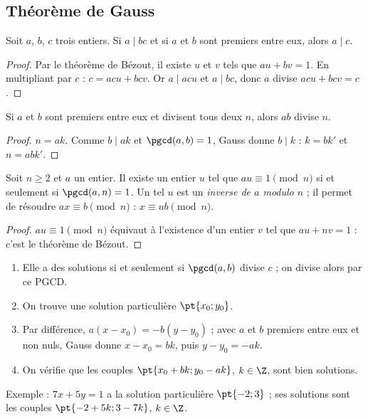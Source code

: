 \subsection{Théorème de Gauss}
\begin{theorem}
Soit $a$, $b$, $c$ trois entiers. Si $a\mid bc$ et si $a$ et $b$ sont premiers entre eux, alors $a\mid c$.
\end{theorem}
\begin{proof}
Par le théorème de Bézout, il existe $u$ et $v$ tels que $au+bv=1$. En multipliant par $c$ : $c=acu+bcv$. Or $a\mid acu$ et $a\mid bc$, donc $a$ divise $acu+bcv=c$.
\end{proof}
\begin{theorem}[Corollaire]
Si $a$ et $b$ sont premiers entre eux et divisent tous deux $n$, alors $ab$ divise $n$.
\end{theorem}
\begin{proof}
$n=ak$. Comme $b\mid ak$ et $\pgcd(a,b)=1$, Gauss donne $b\mid k$ : $k=bk'$ et $n=abk'$.
\end{proof}
\begin{theorem}
Soit $n\ge2$ et $a$ un entier. Il existe un entier $u$ tel que $au\equiv1\pmod n$ si et seulement si $\pgcd(a,n)=1$. Un tel $u$ est un \emph{inverse de $a$ modulo $n$} ; il permet de résoudre $ax\equiv b\pmod n$ : $x\equiv ub\pmod n$.
\end{theorem}
\begin{proof}
$au\equiv1\pmod n$ équivaut à l'existence d'un entier $v$ tel que $au+nv=1$ : c'est le théorème de Bézout.
\end{proof}
\begin{method}[Équation $ax+by=c$ en nombres entiers]
\begin{enumerate}
\item Elle a des solutions si et seulement si $\pgcd(a,b)$ divise $c$ ; on divise alors par ce PGCD.
\item On trouve une solution particulière $\pt{x_0;y_0}$.
\item Par différence, $a(x-x_0)=-b(y-y_0)$ ; avec $a$ et $b$ premiers entre eux et non nuls, Gauss donne $x-x_0=bk$, puis $y-y_0=-ak$.
\item On vérifie que les couples $\pt{x_0+bk;y_0-ak}$, $k\in\Z$, sont bien solutions.
\end{enumerate}
Exemple : $7x+5y=1$ a la solution particulière $\pt{-2;3}$ ; ses solutions sont les couples $\pt{-2+5k;3-7k}$, $k\in\Z$.
\end{method}

